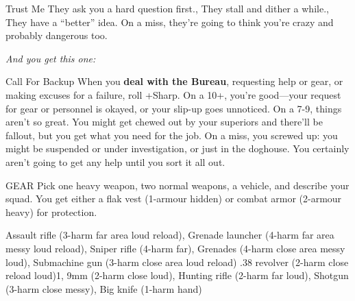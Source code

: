 {\begin{move}{Trust Me}
\holdoptions%
    {They ask you a hard question first.,
    They stall and dither a while.,
    They have a “better” idea.}%
    On a miss, they’re going to think you’re crazy and probably dangerous too.
\end{move}
%
}{%
%
\textit{And you get this one:}\\
%
\begin{move*}{Call For Backup}
When you \textbf{deal with the Bureau}, requesting help or gear, or making excuses for a failure, roll +Sharp.
\br[2mm]
On a 10+, you’re good—your request for gear or personnel is okayed, or your slip-up goes unnoticed. On a 7-9, things aren’t so great. You might get chewed out by your superiors and there’ll be fallout, but you get what you need for the job.
\br[2mm]
On a miss, you screwed up: you might be suspended or under investigation, or just in the doghouse. You certainly aren’t going to get any help until you sort it all out.
\end{move*}
%
\begin{pbsect}{GEAR}
Pick one heavy weapon, two normal weapons, a vehicle, and describe your squad.  You get either a flak vest (1-armour hidden) or combat armor (2-armour heavy) for protection.
\end{pbsect}
\br[4mm]
%
%
    {Assault rifle (3-harm far area loud reload),
    Grenade launcher (4-harm far area messy loud reload),
    Sniper rifle (4-harm far),
    Grenades (4-harm close area messy loud),
    Submachine gun (3-harm close area loud reload)}
\brln
%
%
    {.38 revolver (2-harm close reload loud)1,
    9mm (2-harm close loud),
    Hunting rifle (2-harm far loud),
    Shotgun (3-harm close messy),
    Big knife (1-harm hand)}%
%
}\pagebreak%
%
